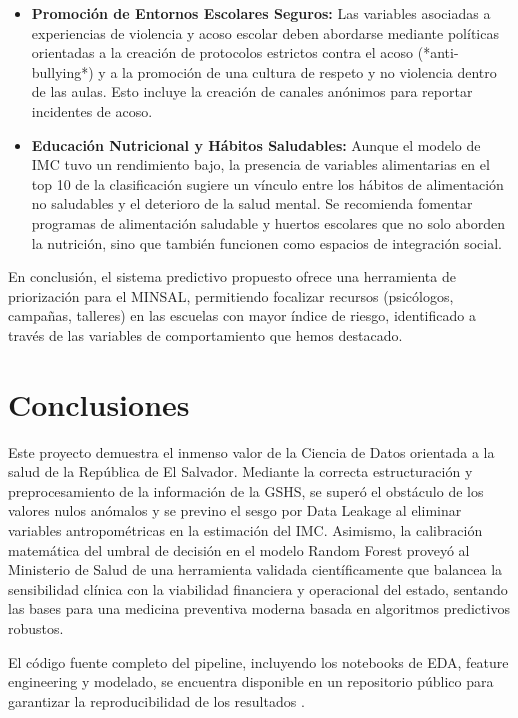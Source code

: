 \documentclass[10pt,journal,compsoc]{IEEEtran}
\begin{document}
\begin{itemize}
    \item \textbf{Promoción de Entornos Escolares Seguros:} Las variables asociadas a experiencias de violencia y acoso escolar deben abordarse mediante políticas orientadas a la creación de protocolos estrictos contra el acoso (*anti-bullying*) y a la promoción de una cultura de respeto y no violencia dentro de las aulas. Esto incluye la creación de canales anónimos para reportar incidentes de acoso.

    \item \textbf{Educación Nutricional y Hábitos Saludables:} Aunque el modelo de IMC tuvo un rendimiento bajo, la presencia de variables alimentarias en el top 10 de la clasificación sugiere un vínculo entre los hábitos de alimentación no saludables y el deterioro de la salud mental. Se recomienda fomentar programas de alimentación saludable y huertos escolares que no solo aborden la nutrición, sino que también funcionen como espacios de integración social.
\end{itemize}

En conclusión, el sistema predictivo propuesto ofrece una herramienta de priorización para el MINSAL, permitiendo focalizar recursos (psicólogos, campañas, talleres) en las escuelas con mayor índice de riesgo, identificado a través de las variables de comportamiento que hemos destacado.

\section{Conclusiones}
Este proyecto demuestra el inmenso valor de la Ciencia de Datos orientada a la salud de la República de El Salvador. Mediante la correcta estructuración y preprocesamiento de la información de la GSHS, se superó el obstáculo de los valores nulos anómalos y se previno el sesgo por Data Leakage al eliminar variables antropométricas en la estimación del IMC. Asimismo, la calibración matemática del umbral de decisión en el modelo Random Forest proveyó al Ministerio de Salud de una herramienta validada científicamente que balancea la sensibilidad clínica con la viabilidad financiera y operacional del estado, sentando las bases para una medicina preventiva moderna basada en algoritmos predictivos robustos.

El código fuente completo del pipeline, incluyendo los notebooks de EDA, feature engineering y modelado, se encuentra disponible en un repositorio público para garantizar la reproducibilidad de los resultados \cite{repo}.
\end{document}
